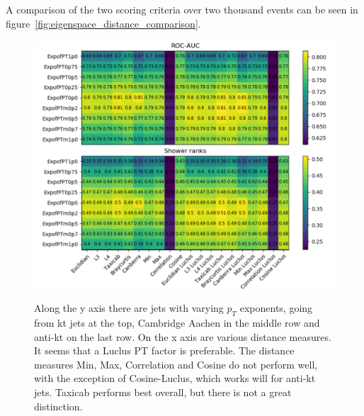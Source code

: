 A comparison of the two scoring criteria over two thousand events can be seen in figure~\ref{fig:eigenspace_distance_comparison}.
\begin{figure}[htp]
    \includegraphics[width=1.\textwidth]{graphics/physspace_distance_comparison}
    \label{fig:physspace_distance_comparison}
    \caption{
            Along the y axis there are jets with varying \(p_T\) exponents, going
            from kt jets at the top, Cambridge Aachen in the middle row and anti-kt
            on the last row.
            On the x axis are various distance measures.
            It seems that a Luclus PT factor is preferable.
            The distance measures Min, Max, Correlation and Cosine
            do not perform well, with the exception of
            Cosine-Luclus, which works will for anti-kt jets.
            Taxicab performs best overall, but there is not
            a great distinction.
             }
\end{figure}    

\FloatBarrier
